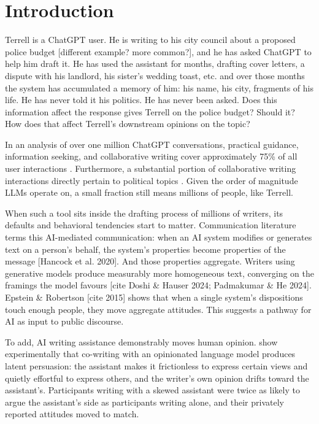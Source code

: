 \section{Introduction}
Terrell is a ChatGPT user. He is writing to his city council about a proposed police budget [different example? more common?], and he has asked ChatGPT to help him draft it. He has used the assistant for months, drafting cover letters, a dispute with his landlord, his sister's wedding toast, etc. and over those months the system has accumulated a memory of him: his name, his city, fragments of his life. He has never told it his politics. He has never been asked. Does this information affect the response gives Terrell on the police budget? Should it? How does that affect Terrell's downstream opinions on the topic? 

In an analysis of over one million ChatGPT conversations, practical guidance, information seeking, and collaborative writing cover approximately 75\% of all user interactions \citep{chatterji_how_2025}. Furthermore, a substantial portion of collaborative writing interactions directly pertain to political topics \citep{zhao_wildchat_2024}. Given the order of magnitude LLMs operate on, a small fraction still means millions of people, like Terrell. 

When such a tool sits inside the drafting process of millions of writers, its defaults and behavioral tendencies start to matter. Communication literature terms this AI-mediated communication: when an AI system modifies or generates text on a person's behalf, the system's properties become properties of the message [Hancock et al. 2020]. And those properties aggregate. Writers using generative models produce measurably more homogeneous text, converging on the framings the model favours [cite Doshi \& Hauser 2024; Padmakumar \& He 2024]. Epstein \& Robertson [cite 2015] shows that when a single system's dispositions touch enough people, they move aggregate attitudes. This suggests a pathway for AI as input to public discourse.


To add, AI writing assistance demonstrably moves human opinion. \citet{jakesch_co-writing_2023} show experimentally that co-writing with an opinionated language model produces latent persuasion: the assistant makes it frictionless to express certain views and quietly effortful to express others, and the writer's own opinion drifts toward the assistant's. Participants writing with a skewed assistant were twice as likely to argue the assistant's side as participants writing alone, and their privately reported attitudes moved to match. 

